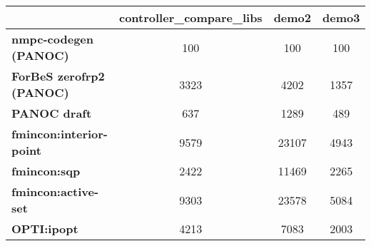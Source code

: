 \begin{tiny}\begin{tabular}{|l|c|c|c|}
\hline
&\textbf{controller_compare_libs}&\textbf{demo2}&\textbf{demo3}\\\hline
\textbf{nmpc-codegen (PANOC)}&100&100&100\\\hline
\textbf{ForBeS zerofrp2 (PANOC)}&3323&4202&1357\\\hline
\textbf{PANOC draft}&637&1289&489\\\hline
\textbf{fmincon:interior-point}&9579&23107&4943\\\hline
\textbf{fmincon:sqp}&2422&11469&2265\\\hline
\textbf{fmincon:active-set}&9303&23578&5084\\\hline
\textbf{OPTI:ipopt}&4213&7083&2003\\\hline
\end{tabular}
\end{tiny}
